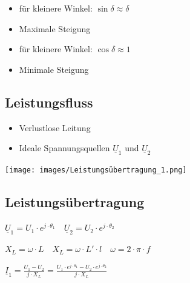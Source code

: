 \begin{minipage}[c]{0.48\columnwidth}
    \begin{itemize}
        \item für kleinere Winkel: $\sin\delta \approx \delta$
        \item Maximale Steigung
    \end{itemize}    
\end{minipage}
\hfill
\begin{minipage}[c]{0.48\columnwidth}
    \begin{itemize}
        \item für kleinere Winkel: $\cos\delta \approx 1$
        \item Minimale Steigung
    \end{itemize}
\end{minipage}


\subsection{Leistungsfluss}

\begin{itemize}
    \item Verlustlose Leitung
    \item Ideale Spannungsquellen $\underline{U}_1$ und $\underline{U}_2$
\end{itemize}

\vspace{0.15cm}

\texttt{[image: images/Leistungsübertragung\_1.png]}

\vspace{0.15cm}


\subsection{Leistungsübertragung}

$
\boxed{\underline{U}_1 = U_1 \cdot e^{j \cdot \theta_1}} \quad \boxed{\underline{U}_2 = U_2 \cdot e^{j \cdot \theta_2}}
$

\vspace{0.15cm}

$
\boxed{X_L = \omega \cdot L}
\quad
\boxed{X_L = \omega \cdot L' \cdot l}
\quad
\boxed{\omega = 2 \cdot \pi \cdot f}
$

\vspace{0.15cm}

$
\boxed{
\underline{I}_1 = \frac{U_1 - U_2}{j \cdot X_L} = \frac{U_1 \cdot e^{j \cdot \theta_1} - U_2 \cdot e^{j \cdot \theta_2}}{j \cdot X_L}} \quad 
$


